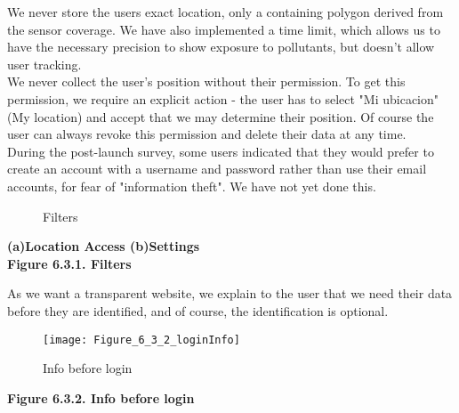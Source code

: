 We never store the users exact location, only a containing polygon derived from the sensor coverage.
We have also implemented a time limit, which allows us to have the necessary precision to show exposure to pollutants, but doesn't allow user tracking.\\

We never collect the user's position without their permission.
To get this permission, we require an explicit action - the user has to select "Mi ubicacion" (My location) and accept that we may determine their position.
Of course the user can always revoke this permission and delete their data at any time. \\

During the post-launch survey, some users indicated that they would prefer to create an account with a username and password rather than use their email accounts, for fear of "information theft".
We have not yet done this. \\

\begin{figure}[ht]
    \centering
    \hfill
    \caption{Filters}
\end{figure}

\begin{center}
    \bf{ (a)Location Access (b)Settings\\

    Figure 6.3.1. Filters}
  \end{center} 


As we want a transparent website, we explain to the user that we need their data before
they are identified, and of course, the identification is optional. \\

\begin{figure}[ht]
    \centering
    \texttt{[image: Figure\_6\_3\_2\_loginInfo]}
    \caption{Info before login}
\end{figure}
\begin{center}
    \bf{ 
    Figure 6.3.2. Info before login}
  \end{center} 